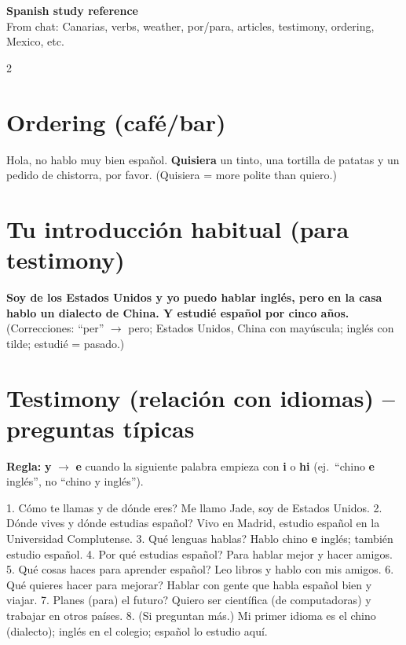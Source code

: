 \documentclass[10pt,landscape,a4paper]{article}
\begin{document}
\begin{center}
{\large\bfseries\color{accent} Spanish study reference}\\[0.2em]
\small From chat: Canarias, verbs, weather, por/para, articles, testimony, ordering, Mexico, etc.
\end{center}
\vspace{0.4em}

\begin{multicols}{2}

\section*{\color{accent}Ordering (caf\'e/bar)}
Hola, no hablo muy bien espa\~nol. \textbf{Quisiera} un tinto, una tortilla de patatas y un pedido de chistorra, por favor. (Quisiera = more polite than quiero.)

\section*{\color{accent}Tu introducci\'on habitual (para testimony)}
\textbf{Soy de los Estados Unidos y yo puedo hablar ingl\'es, pero en la casa hablo un dialecto de China. Y estudi\'e espa\~nol por cinco a\~nos.}\\
\footnotesize (Correcciones: ``per'' $\to$ pero; Estados Unidos, China con may\'uscula; ingl\'es con tilde; estudi\'e = pasado.)

\section*{\color{accent}Testimony (relaci\'on con idiomas) -- preguntas t\'ipicas}
\textbf{Regla:} \textbf{y} $\to$ \textbf{e} cuando la siguiente palabra empieza con \textbf{i} o \textbf{hi} (ej.\ ``chino \textbf{e} ingl\'es'', no ``chino y ingl\'es'').

1. \textquestiondown C\'omo te llamas y de d\'onde eres? Me llamo Jade, soy de Estados Unidos. 2. \textquestiondown D\'onde vives y d\'onde estudias espa\~nol? Vivo en Madrid, estudio espa\~nol en la Universidad Complutense. 3. \textquestiondown Qu\'e lenguas hablas? Hablo chino \textbf{e} ingl\'es; tambi\'en estudio espa\~nol. 4. \textquestiondown Por qu\'e estudias espa\~nol? Para hablar mejor y hacer amigos. 5. \textquestiondown Qu\'e cosas haces para aprender espa\~nol? Leo libros y hablo con mis amigos. 6. \textquestiondown Qu\'e quieres hacer para mejorar? Hablar con gente que habla espa\~nol bien y viajar. 7. \textquestiondown Planes (para) el futuro? Quiero ser cient\'ifica (de computadoras) y trabajar en otros pa\'ises. 8. (Si preguntan m\'as.) Mi primer idioma es el chino (dialecto); ingl\'es en el colegio; espa\~nol lo estudio aqu\'i.


\end{multicols}
\end{document}
